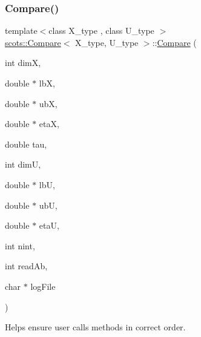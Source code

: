 \subsubsection{\texorpdfstring{Compare()}{Compare()}}
{\footnotesize\ttfamily template$<$class X\+\_\+type , class U\+\_\+type $>$ \\
\hyperlink{classscots_1_1Compare}{scots\+::\+Compare}$<$ X\+\_\+type, U\+\_\+type $>$\+::\hyperlink{classscots_1_1Compare}{Compare} (\begin{DoxyParamCaption}\item[{int}]{dimX,  }\item[{double $\ast$}]{lbX,  }\item[{double $\ast$}]{ubX,  }\item[{double $\ast$}]{etaX,  }\item[{double}]{tau,  }\item[{int}]{dimU,  }\item[{double $\ast$}]{lbU,  }\item[{double $\ast$}]{ubU,  }\item[{double $\ast$}]{etaU,  }\item[{int}]{nint,  }\item[{int}]{read\+Ab,  }\item[{char $\ast$}]{log\+File }\end{DoxyParamCaption})\hspace{0.3cm}{\ttfamily [inline]}}

Helps ensure user calls methods in correct order.

